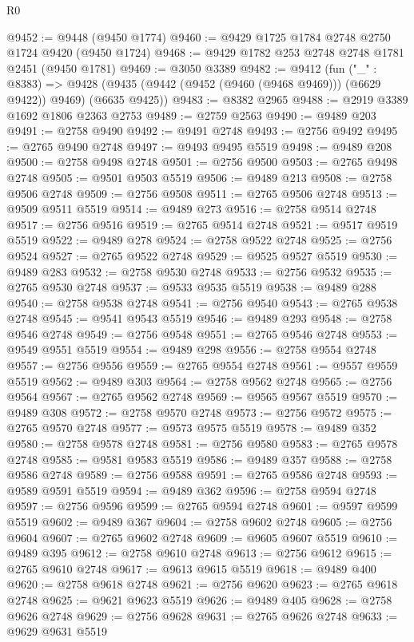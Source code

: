\begin{lexlean}{R0}
\begin{coremodule}
@9452 := @9448 (@9450 @1774)
@9460 := @9429 @1725 @1784 @2748 @2750 @1724 @9420 (@9450 @1724)
@9468 := @9429 @1782 @253 @2748 @2748 @1781 @2451 (@9450 @1781)
@9469 := @3050 @3389
@9482 := @9412
    (fun ("_" : @8383) =>
    @9428 (@9435 (@9442 (@9452 (@9460 (@9468 @9469))) (@6629 @9422)) @9469) (@6635 @9425))
@9483 := @8382 @2965
@9488 := @2919 @3389 @1692 @1806 @2363 @2753
@9489 := @2759 @2563
@9490 := @9489 @203
@9491 := @2758 @9490
@9492 := @9491 @2748
@9493 := @2756 @9492
@9495 := @2765 @9490 @2748
@9497 := @9493 @9495 @5519
@9498 := @9489 @208
@9500 := @2758 @9498 @2748
@9501 := @2756 @9500
@9503 := @2765 @9498 @2748
@9505 := @9501 @9503 @5519
@9506 := @9489 @213
@9508 := @2758 @9506 @2748
@9509 := @2756 @9508
@9511 := @2765 @9506 @2748
@9513 := @9509 @9511 @5519
@9514 := @9489 @273
@9516 := @2758 @9514 @2748
@9517 := @2756 @9516
@9519 := @2765 @9514 @2748
@9521 := @9517 @9519 @5519
@9522 := @9489 @278
@9524 := @2758 @9522 @2748
@9525 := @2756 @9524
@9527 := @2765 @9522 @2748
@9529 := @9525 @9527 @5519
@9530 := @9489 @283
@9532 := @2758 @9530 @2748
@9533 := @2756 @9532
@9535 := @2765 @9530 @2748
@9537 := @9533 @9535 @5519
@9538 := @9489 @288
@9540 := @2758 @9538 @2748
@9541 := @2756 @9540
@9543 := @2765 @9538 @2748
@9545 := @9541 @9543 @5519
@9546 := @9489 @293
@9548 := @2758 @9546 @2748
@9549 := @2756 @9548
@9551 := @2765 @9546 @2748
@9553 := @9549 @9551 @5519
@9554 := @9489 @298
@9556 := @2758 @9554 @2748
@9557 := @2756 @9556
@9559 := @2765 @9554 @2748
@9561 := @9557 @9559 @5519
@9562 := @9489 @303
@9564 := @2758 @9562 @2748
@9565 := @2756 @9564
@9567 := @2765 @9562 @2748
@9569 := @9565 @9567 @5519
@9570 := @9489 @308
@9572 := @2758 @9570 @2748
@9573 := @2756 @9572
@9575 := @2765 @9570 @2748
@9577 := @9573 @9575 @5519
@9578 := @9489 @352
@9580 := @2758 @9578 @2748
@9581 := @2756 @9580
@9583 := @2765 @9578 @2748
@9585 := @9581 @9583 @5519
@9586 := @9489 @357
@9588 := @2758 @9586 @2748
@9589 := @2756 @9588
@9591 := @2765 @9586 @2748
@9593 := @9589 @9591 @5519
@9594 := @9489 @362
@9596 := @2758 @9594 @2748
@9597 := @2756 @9596
@9599 := @2765 @9594 @2748
@9601 := @9597 @9599 @5519
@9602 := @9489 @367
@9604 := @2758 @9602 @2748
@9605 := @2756 @9604
@9607 := @2765 @9602 @2748
@9609 := @9605 @9607 @5519
@9610 := @9489 @395
@9612 := @2758 @9610 @2748
@9613 := @2756 @9612
@9615 := @2765 @9610 @2748
@9617 := @9613 @9615 @5519
@9618 := @9489 @400
@9620 := @2758 @9618 @2748
@9621 := @2756 @9620
@9623 := @2765 @9618 @2748
@9625 := @9621 @9623 @5519
@9626 := @9489 @405
@9628 := @2758 @9626 @2748
@9629 := @2756 @9628
@9631 := @2765 @9626 @2748
@9633 := @9629 @9631 @5519

\end{coremodule}
\end{lexlean}
